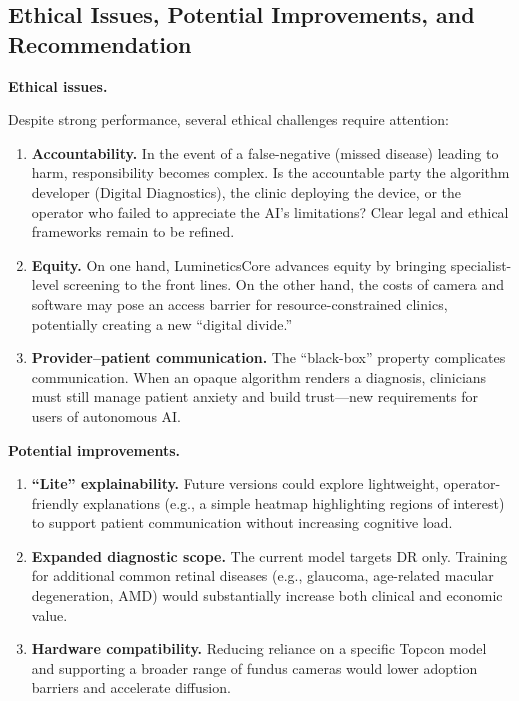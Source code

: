 \documentclass[sigplan,screen]{acmart}
\begin{document}
\subsection{Ethical Issues, Potential Improvements, and Recommendation}

\textbf{Ethical issues.}

Despite strong performance, several ethical challenges require attention:

\begin{enumerate}
\item \textbf{Accountability.} In the event of a false-negative (missed disease) leading to harm, responsibility becomes complex. Is the accountable party the algorithm developer (Digital Diagnostics), the clinic deploying the device, or the operator who failed to appreciate the AI's limitations? Clear legal and ethical frameworks remain to be refined.

\item \textbf{Equity.} On one hand, LumineticsCore advances equity by bringing specialist-level screening to the front lines. On the other hand, the costs of camera and software may pose an access barrier for resource-constrained clinics, potentially creating a new ``digital divide.''

\item \textbf{Provider--patient communication.} The ``black-box'' property complicates communication. When an opaque algorithm renders a diagnosis, clinicians must still manage patient anxiety and build trust---new requirements for users of autonomous AI.
\end{enumerate}

\textbf{Potential improvements.}

\begin{enumerate}
\item \textbf{``Lite'' explainability.} Future versions could explore lightweight, operator-friendly explanations (e.g., a simple heatmap highlighting regions of interest) to support patient communication without increasing cognitive load.

\item \textbf{Expanded diagnostic scope.} The current model targets DR only. Training for additional common retinal diseases (e.g., glaucoma, age-related macular degeneration, AMD) would substantially increase both clinical and economic value.

\item \textbf{Hardware compatibility.} Reducing reliance on a specific Topcon model and supporting a broader range of fundus cameras would lower adoption barriers and accelerate diffusion.
\end{enumerate}
\end{document}
